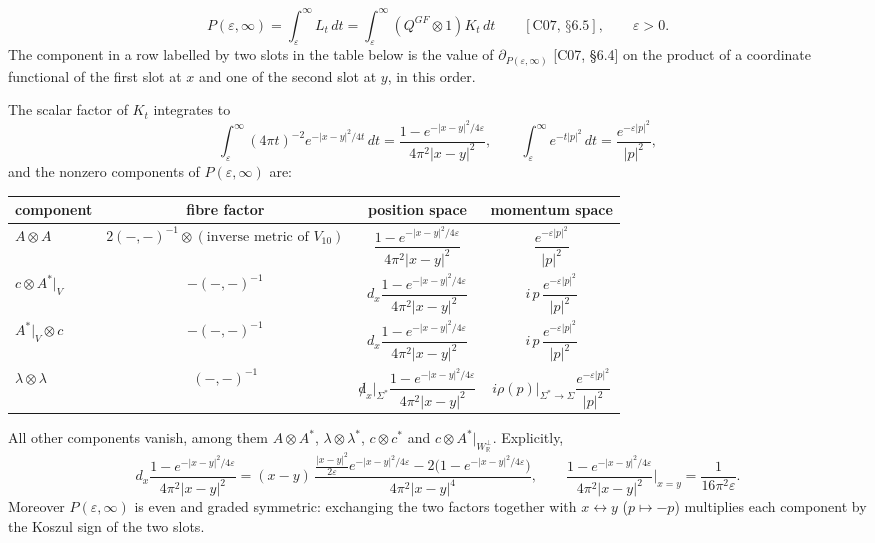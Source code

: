 \begin{definition}[Propagator]
\label{def:c3-P}
\[
P(\varepsilon,\infty)=\int_\varepsilon^\infty L_t\,dt=\int_\varepsilon^\infty(Q^{GF}\otimes1)K_t\,dt\qquad[\text{C07, §6.5}],\qquad \varepsilon>0 .
\]
The component in a row labelled by two slots in the table below is the value of $\partial_{P(\varepsilon,\infty)}$ [C07, §6.4] on the product of a coordinate functional of the first slot at $x$ and one of the second slot at $y$, in this order.
\end{definition}

\begin{proposition}
\label{prop:c3-P}
The scalar factor of $K_t$ integrates to
\[
\int_\varepsilon^\infty(4\pi t)^{-2}e^{-|x-y|^2/4t}\,dt=\frac{1-e^{-|x-y|^2/4\varepsilon}}{4\pi^2|x-y|^2},\qquad \int_\varepsilon^\infty e^{-t|p|^2}\,dt=\frac{e^{-\varepsilon|p|^2}}{|p|^2},
\]
and the nonzero components of $P(\varepsilon,\infty)$ are:

\begin{tabular}{l|c|c|c}
component & fibre factor & position space & momentum space \\
\hline
$A\otimes A$ & $2(-,-)^{-1}\otimes(\text{inverse metric of }V_{10})$ & $\dfrac{1-e^{-|x-y|^2/4\varepsilon}}{4\pi^2|x-y|^2}$ & $\dfrac{e^{-\varepsilon|p|^2}}{|p|^2}$ \\
$c\otimes A^*|_V$ & $-(-,-)^{-1}$ & $d_x\dfrac{1-e^{-|x-y|^2/4\varepsilon}}{4\pi^2|x-y|^2}$ & $i\,p\,\dfrac{e^{-\varepsilon|p|^2}}{|p|^2}$ \\
$A^*|_V\otimes c$ & $-(-,-)^{-1}$ & $d_x\dfrac{1-e^{-|x-y|^2/4\varepsilon}}{4\pi^2|x-y|^2}$ & $i\,p\,\dfrac{e^{-\varepsilon|p|^2}}{|p|^2}$ \\
$\lambda\otimes\lambda$ & $(-,-)^{-1}$ & ${\not d}_x|_{\Sigma^*}\dfrac{1-e^{-|x-y|^2/4\varepsilon}}{4\pi^2|x-y|^2}$ & $i\rho(p)|_{\Sigma^*\to\Sigma}\dfrac{e^{-\varepsilon|p|^2}}{|p|^2}$ \\
\end{tabular}

All other components vanish, among them $A\otimes A^*$, $\lambda\otimes\lambda^*$, $c\otimes c^*$ and $c\otimes A^*|_{W_{\mathbb R}^\perp}$. Explicitly,
\[
d_x\frac{1-e^{-|x-y|^2/4\varepsilon}}{4\pi^2|x-y|^2}=(x-y)\,\frac{\frac{|x-y|^2}{2\varepsilon}e^{-|x-y|^2/4\varepsilon}-2\big(1-e^{-|x-y|^2/4\varepsilon}\big)}{4\pi^2|x-y|^4},\qquad \frac{1-e^{-|x-y|^2/4\varepsilon}}{4\pi^2|x-y|^2}\bigg|_{x=y}=\frac1{16\pi^2\varepsilon}.
\]
Moreover $P(\varepsilon,\infty)$ is even and graded symmetric: exchanging the two factors together with $x\leftrightarrow y$ ($p\mapsto-p$) multiplies each component by the Koszul sign of the two slots.
\end{proposition}

